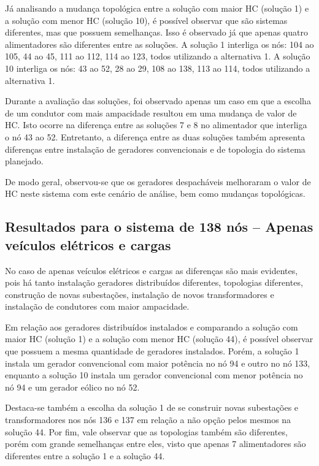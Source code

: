Já analisando a mudança topológica entre a solução com maior \ac{HC} (solução 1) e a solução com menor \ac{HC} (solução 10), é possível observar que são sistemas diferentes, mas que possuem semelhanças. Isso é observado já que apenas quatro alimentadores são diferentes entre as soluções. A solução 1 interliga os nós: 104 ao 105, 44 ao 45, 111 ao 112, 114 ao 123, todos utilizando a alternativa 1. A solução 10 interliga os nós: 43 ao 52, 28 ao 29, 108 ao 138, 113 ao 114, todos utilizando a alternativa 1.

Durante a avaliação das soluções, foi observado apenas um caso em que a escolha de um condutor com mais ampacidade resultou em uma mudança de valor de \ac{HC}. Isto ocorre na diferença entre as soluções 7 e 8 no alimentador que interliga o nó 43 ao 52. Entretanto, a diferença entre as duas soluções também apresenta diferenças entre instalação de geradores convencionais e de topologia do sistema planejado.

De modo geral, observou-se que os geradores despacháveis melhoraram o valor de \ac{HC} neste sistema com este cenário de análise, bem como mudanças topológicas.

\subsection{Resultados para o sistema de 138 nós -- Apenas veículos elétricos e cargas}

No caso de apenas veículos elétricos e cargas as diferenças são mais evidentes, pois há tanto instalação geradores distribuídos diferentes, topologias diferentes, construção de novas subestações, instalação de novos transformadores e instalação de condutores com maior ampacidade.

Em relação aos geradores distribuídos instalados e comparando a solução com maior \ac{HC} (solução 1) e a solução com menor \ac{HC} (solução 44), é possível observar que possuem a mesma quantidade de geradores instalados. Porém, a solução 1 instala um gerador convencional com maior potência no nó 94 e outro no nó 133, enquanto a solução 10 instala um gerador convencional com menor potência no nó 94 e um gerador eólico no nó 52.

Destaca-se também a escolha da solução 1 de se construir novas subestações e transformadores nos nós 136 e 137 em relação a não opção pelos mesmos na solução 44. Por fim, vale observar que as topologias também são diferentes, porém com grande semelhanças entre eles, visto que apenas 7 alimentadores são diferentes entre a solução 1 e a solução 44.

